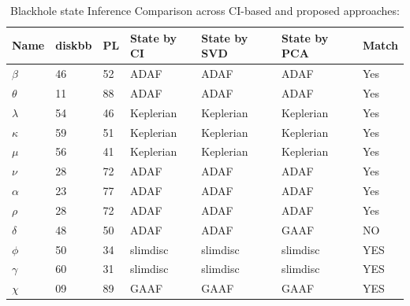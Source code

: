 \documentclass[journal]{IEEEtran}
\begin{document}
		\begin{table}[t]
		\caption{Blackhole state Inference Comparison across CI-based and proposed approaches:}
		\begin{center}
			\begin{tabular}{|p{0.5cm}|p{0.8cm}|p{0.75cm}|p{1.25cm}|p{1.25cm}|p{1.25cm}|p{0.70cm}|}
				\hline
				Name & diskbb & PL & State by CI & State by SVD  & State by PCA  &  Match \\
				\hline
				$\beta$ & 46 & 52 & ADAF & ADAF & ADAF & Yes\\
				\hline
                $\theta$ & 11 & 88 & ADAF & ADAF & ADAF & Yes\\
				\hline
                $\lambda$ & 54 & 46 & Keplerian & Keplerian & Keplerian & Yes\\
				\hline
               $\kappa$ & 59 & 51 & Keplerian & Keplerian & Keplerian & Yes\\
				\hline
               $\mu$ & 56 & 41 & Keplerian & Keplerian & Keplerian & Yes\\
               \hline
              $\nu$ & 28 & 72 &  ADAF & ADAF & ADAF & Yes\\
              \hline
             $\alpha$ & 23 & 77 &  ADAF & ADAF & ADAF & Yes\\
             \hline
             $\rho$ & 28 & 72 &  ADAF & ADAF & ADAF & Yes\\
\hline
 $\delta$ & 48 & 50 & ADAF & ADAF & GAAF & NO\\
\hline
$\phi$ & 50 & 34 & slimdisc & slimdisc & slimdisc & YES\\
\hline
$\gamma$ & 60 & 31 & slimdisc & slimdisc & slimdisc & YES\\
\hline
$\chi$ & 09 & 89 & GAAF & GAAF & GAAF & YES\\
\hline
				\hline
			\end{tabular}
			\label{tab:results}
		\end{center}
	\end{table}
	
\end{document}
